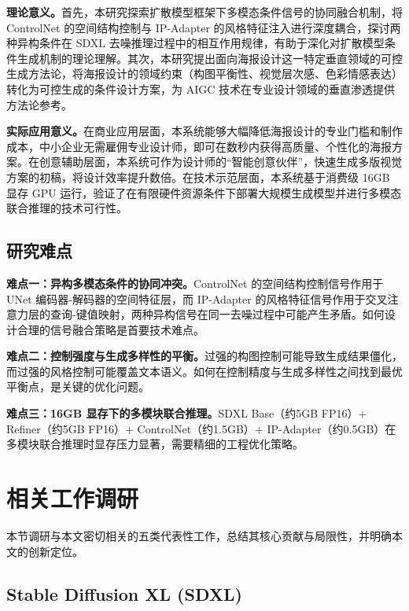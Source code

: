 \documentclass[10pt,a4paper]{article}
\begin{document}
\textbf{理论意义。}首先，本研究探索扩散模型框架下多模态条件信号的协同融合机制，将 ControlNet 的空间结构控制与 IP-Adapter 的风格特征注入进行深度耦合，探讨两种异构条件在 SDXL 去噪推理过程中的相互作用规律，有助于深化对扩散模型条件生成机制的理论理解。其次，本研究提出面向海报设计这一特定垂直领域的可控生成方法论，将海报设计的领域约束（构图平衡性、视觉层次感、色彩情感表达）转化为可控生成的条件设计方案，为 AIGC 技术在专业设计领域的垂直渗透提供方法论参考。

\textbf{实际应用意义。}在商业应用层面，本系统能够大幅降低海报设计的专业门槛和制作成本，中小企业无需雇佣专业设计师，即可在数秒内获得高质量、个性化的海报方案。在创意辅助层面，本系统可作为设计师的``智能创意伙伴''，快速生成多版视觉方案的初稿，将设计效率提升数倍。在技术示范层面，本系统基于消费级 16GB 显存 GPU 运行，验证了在有限硬件资源条件下部署大规模生成模型并进行多模态联合推理的技术可行性。

\subsection{研究难点}

\textbf{难点一：异构多模态条件的协同冲突。}ControlNet 的空间结构控制信号作用于 UNet 编码器-解码器的空间特征层，而 IP-Adapter 的风格特征信号作用于交叉注意力层的查询-键值映射，两种异构信号在同一去噪过程中可能产生矛盾。如何设计合理的信号融合策略是首要技术难点。

\textbf{难点二：控制强度与生成多样性的平衡。}过强的构图控制可能导致生成结果僵化，而过强的风格控制可能覆盖文本语义。如何在控制精度与生成多样性之间找到最优平衡点，是关键的优化问题。

\textbf{难点三：16GB 显存下的多模块联合推理。}SDXL Base（约5GB FP16）+ Refiner（约5GB FP16）+ ControlNet（约1.5GB）+ IP-Adapter（约0.5GB）在多模块联合推理时显存压力显著，需要精细的工程优化策略。

\section{相关工作调研}

本节调研与本文密切相关的五类代表性工作，总结其核心贡献与局限性，并明确本文的创新定位。

\subsection{Stable Diffusion XL (SDXL)}
\end{document}
